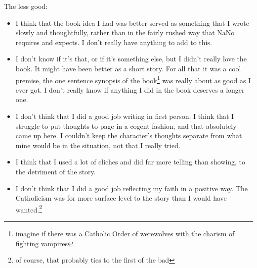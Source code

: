 \documentclass[12pt]{article}[titlepage]
\newcommand{\1}{\={a}}
\newcommand{\2}{\={e}}
\newcommand{\3}{\={\i}}
\newcommand{\4}{\=o}
\newcommand{\5}{\=u}
\newcommand{\6}{\={A}}
\renewcommand{\,}{\textsuperscript{,}}
\begin{document}
The less good:
\begin{itemize}
\item I think that the book idea I had was better served as something that I wrote slowly and thoughtfully, rather than in the fairly rushed way that NaNo requires and expects.
I don't really have anything to add to this. 
\item I don't know if it's that, or if it's something else, but I didn't really love the book.
It might have been better as a short story.
For all that it was a cool premise, the one sentence synopsis of the book\footnote{imagine if there was a Catholic Order of werewolves with the charism of fighting vampires} was really about as good as I ever got.
I don't really know if anything I did in the book deserves a longer one.  
\item I don't think that I did a good job writing in first person.
I think that I struggle to put thoughts to page in a cogent fashion, and that absolutely came up here.
I couldn't keep the character's thoughts separate from what mine would be in the situation, not that I really tried. 
\item I think that I used a lot of cliches and did far more telling than showing, to the detriment of the story.
\item I don't think that I did a good job reflecting my faith in a positive way. The Catholicism was for more surface level to the story than I would have wanted.\footnote{of course, that probably ties to the first of the bad} 
\end{itemize}
 
\end{document}
